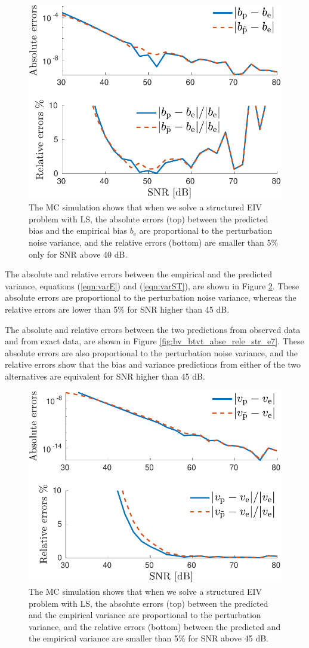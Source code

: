 \begin{figure}[htb!]
  \centering
  \includegraphics[width=0.69\columnwidth]{./ChapterStatisticalAnalysis/fig/Fig_8.pdf} 
  \caption{ \label{fig:b_bt_abse_rele_str_e7} The MC simulation shows that when we solve a structured EIV problem with LS, the absolute errors (top) between the predicted bias and the empirical bias $b_{\mathrm{e}}$ are proportional to the perturbation noise variance, and the relative errors (bottom) are smaller than 5\% only for SNR above 40 dB.}
\end{figure}


The absolute and relative errors between the empirical and the predicted variance, equations (\ref{eqn:varE}) and (\ref{eqn:varST}), are shown in Figure \ref{fig:v_vt_abse_rele_str_e7}.
These absolute errors are proportional to the perturbation noise variance, whereas
the relative errors are lower than 5\% for SNR higher than 45 dB. 

The absolute and relative errors between the two predictions from observed data and from exact data, are shown in Figure \ref{fig:bv_btvt_abse_rele_str_e7}.
These absolute errors are also proportional to the perturbation noise variance, and
the relative errors show that the bias and variance predictions from either of the two alternatives are equivalent for SNR higher than 45 dB.

\begin{figure}[htb!]
  \centering
  \includegraphics[width=0.69\columnwidth]{./ChapterStatisticalAnalysis/fig/Fig_9.pdf} 
  \caption{ \label{fig:v_vt_abse_rele_str_e7} The MC simulation shows that when we solve a structured EIV problem with LS, the absolute errors (top) between the predicted and the empirical variance are proportional to the perturbation variance, and the relative errors (bottom) between the predicted and the empirical variance are smaller than 5\% for SNR above 45 dB. }
\end{figure}

